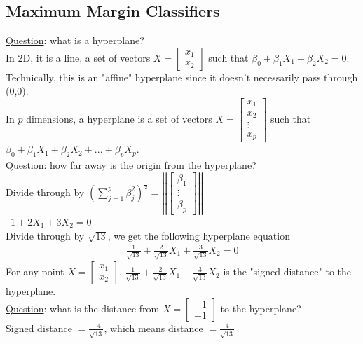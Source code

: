 \documentclass[12pt, letterpaper]{article}
\begin{document}
\subsection{Maximum Margin Classifiers}
\underline{Question}: what is a hyperplane? \\
In 2D, it is a line, a set of vectors $X = \begin{bmatrix}
    x_1 \\ x_2
\end{bmatrix}$ such that $\beta_0 + \beta_1X_1 + \beta_2X_2 = 0$. 
Technically, this is an "affine" hyperplane since it doesn't necessarily pass through (0,0). \\
In $p$ dimensions, a hyperplane is a set of vectors $X = \begin{bmatrix}
    x_1 \\ x_2 \\ \vdots \\ x_p
\end{bmatrix}$ such that $\beta_0 + \beta_1X_1 + \beta_2X_2+...+\beta_pX_p$. \\

\noindent \underline{Question}: how far away is the origin from the hyperplane? \\
Divide through by $(\sum_{j=1}^{p}\beta_j^2)^\frac12 = \left|\left|\begin{bmatrix}
    \beta_1 \\ \vdots \\ \beta_p
\end{bmatrix}\right|\right|$ \\
\ $1 + 2X_1 + 3X_2 = 0$ \\
Divide through by $\sqrt{13}$, we get the following hyperplane equation
\begin{align*}
    \frac{1}{\sqrt{13}} + \frac{2}{\sqrt{13}} X_1 + \frac{3}{\sqrt{13}} X_2 = 0
\end{align*}
For any point $X = \begin{bmatrix}
    x_1 \\ x_2
\end{bmatrix}$, $\frac{1}{\sqrt{13}} + \frac{2}{\sqrt{13}} X_1 + \frac{3}{\sqrt{13}} X_2$ 
is the "signed distance" to the hyperplane. \\
\underline{Question}: what is the distance from $X = \begin{bmatrix}
    -1 \\ -1
\end{bmatrix}$ to the hyperplane?\\
Signed distance $ = \frac{-4}{\sqrt{13}}$, which means distance $ = \frac{4}{\sqrt{13}}$ 
\end{document}
